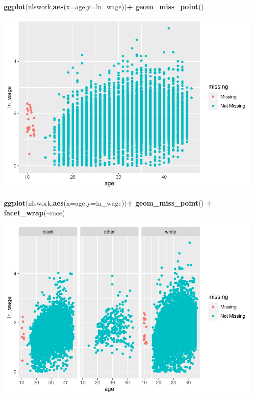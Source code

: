 \documentclass[
]{article}
\newenvironment{Shaded}{\begin{snugshade}}{\end{snugshade}}
\newcommand{\AttributeTok}[1]{\textcolor[rgb]{0.13,0.29,0.53}{#1}}
\newcommand{\FunctionTok}[1]{\textcolor[rgb]{0.13,0.29,0.53}{\textbf{#1}}}
\newcommand{\NormalTok}[1]{#1}
\newcommand{\SpecialCharTok}[1]{\textcolor[rgb]{0.81,0.36,0.00}{\textbf{#1}}}
\begin{document}
\begin{Shaded}
\begin{Highlighting}[]
\FunctionTok{ggplot}\NormalTok{(nlswork,}\FunctionTok{aes}\NormalTok{(}\AttributeTok{x=}\NormalTok{age,}\AttributeTok{y=}\NormalTok{ln\_wage))}\SpecialCharTok{+}
  \FunctionTok{geom\_miss\_point}\NormalTok{()}
\end{Highlighting}
\end{Shaded}

\includegraphics{RIntro_files/figure-latex/unnamed-chunk-9-2.pdf}

\begin{Shaded}
\begin{Highlighting}[]
\FunctionTok{ggplot}\NormalTok{(nlswork,}\FunctionTok{aes}\NormalTok{(}\AttributeTok{x=}\NormalTok{age,}\AttributeTok{y=}\NormalTok{ln\_wage))}\SpecialCharTok{+}
  \FunctionTok{geom\_miss\_point}\NormalTok{() }\SpecialCharTok{+}
  \FunctionTok{facet\_wrap}\NormalTok{(}\SpecialCharTok{\textasciitilde{}}\NormalTok{race)}
\end{Highlighting}
\end{Shaded}

\includegraphics{RIntro_files/figure-latex/unnamed-chunk-9-3.pdf}
\end{document}
